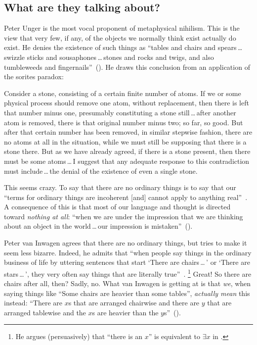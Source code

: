 \subsection{What are they talking about?}
Peter Unger is the most vocal proponent of metaphysical nihilism. This is the view that very few, if any, of the objects we normally think exist actually do exist. He denies the existence of such things as ``tables and chairs and spears\,\ldots\,swizzle sticks and sousaphones\,\ldots\,stones and rocks and twigs, and also tumbleweeds and fingernails''~(\citeyear[117]{unger1979}). He draws this conclusion from an application of the sorites paradox:
\begin{squote}
Consider a stone, consisting of a certain finite number of atoms. If we or some physical process should remove one atom, without replacement, then there is left that number minus one, presumably constituting a stone still\,\ldots\,after another atom is removed, there is that original number minus two; so far, so good. But after that certain number has been removed, in similar stepwise fashion, there are no atoms at all in the situation, while we must still be supposing that there is a stone there. But as we have already agreed, if there is a stone present, then there must
be some atoms\,\ldots\,I suggest that any adequate response to this contradiction must include\,\ldots\,the denial of the existence of even a single stone.~\citep[121--122]{unger1979}
\end{squote}
This seems crazy. To say that there are no ordinary things is to say that our ``terms for ordinary things are incoherent [and] cannot apply to anything real''~\citep[147]{unger1979}. A consequence of this is that most of our language and thought is directed toward {\em nothing at all}: ``when we are under the impression that we are thinking about an object in the world\,\ldots\,our impression is mistaken''~(\citeyear[149]{unger1979}).

Peter van Inwagen agrees that there are no ordinary things, but tries to make it seem less bizarre. Indeed, he admits that ``when people say things in the ordinary business of life by uttering sentences that start `There are chairs\,\ldots\,' or `There are stars\,\ldots\,', they very often say things that are literally true''~\cite[102]{inwagen1995}.%
%
\footnote{He argues (persuasively) that ``there is an $x$'' is equivalent to $\exists x$ in \citet{inwagen1998}.} %
%
Great! So there are chairs after all, then? Sadly, no. What van Inwagen is getting at is that {\em we}, when saying things like ``Some chairs are heavier than some tables'', {\em actually mean} this instead: ``There are $x$s that are arranged chairwise and there are $y$ that are arranged tablewise and the $x$s are heavier than the $y$s''~(\citeyear[109]{inwagen1995}).

